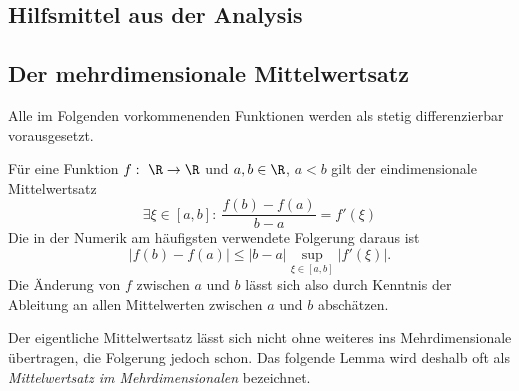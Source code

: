 \documentclass[
]{mycourse}
\theoremstyle{mythm}
\theoremstyle{break}
\begin{document}
\begin{appendix} 

\chapter{Hilfsmittel aus der Analysis}

\section{Der mehrdimensionale Mittelwertsatz}
Alle im Folgenden vorkommenenden Funktionen werden als stetig differenzierbar vorausgesetzt.

Für eine Funktion $f:\ \R\to \R$ und $a,b\in \R$, $a<b$ gilt der eindimensionale
Mittelwertsatz 
\[
\exists \xi\in [a,b]:\ \frac{f(b)-f(a)}{b-a}=f'(\xi)
\]
Die in der Numerik am häufigsten verwendete Folgerung daraus ist
\[
|f(b)-f(a)|\leq |b-a| \sup_{\xi \in [a,b]} |f'(\xi)|.
\]
Die Änderung von $f$ zwischen $a$ und $b$ lässt sich also durch Kenntnis der Ableitung
an allen Mittelwerten zwischen $a$ und $b$ abschätzen.

Der eigentliche Mittelwertsatz lässt sich nicht ohne weiteres ins Mehrdimensionale übertragen, die Folgerung
jedoch schon. Das folgende Lemma wird deshalb oft als \emph{Mittelwertsatz im Mehrdimensionalen}
bezeichnet.


\end{appendix}
\end{document}
